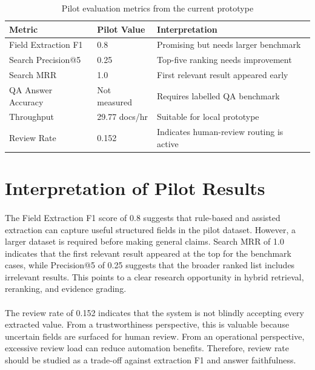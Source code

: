 \begin{table}[h]
\centering
\begin{tabular}{lll}
\toprule
\textbf{Metric} & \textbf{Pilot Value} & \textbf{Interpretation} \\
\midrule
Field Extraction F1 & 0.8 & Promising but needs larger benchmark \\
Search Precision@5 & 0.25 & Top-five ranking needs improvement \\
Search MRR & 1.0 & First relevant result appeared early \\
QA Answer Accuracy & Not measured & Requires labelled QA benchmark \\
Throughput & 29.77 docs/hr & Suitable for local prototype \\
Review Rate & 0.152 & Indicates human-review routing is active \\
\bottomrule
\end{tabular}
\caption{Pilot evaluation metrics from the current prototype}
\label{tab:evaluation_results}
\end{table}

\section{Interpretation of Pilot Results}
\paragraph{} The Field Extraction F1 score of 0.8 suggests that rule-based and assisted extraction can capture useful structured fields in the pilot dataset. However, a larger dataset is required before making general claims. Search MRR of 1.0 indicates that the first relevant result appeared at the top for the benchmark cases, while Precision@5 of 0.25 suggests that the broader ranked list includes irrelevant results. This points to a clear research opportunity in hybrid retrieval, reranking, and evidence grading.

\paragraph{} The review rate of 0.152 indicates that the system is not blindly accepting every extracted value. From a trustworthiness perspective, this is valuable because uncertain fields are surfaced for human review. From an operational perspective, excessive review load can reduce automation benefits. Therefore, review rate should be studied as a trade-off against extraction F1 and answer faithfulness.

